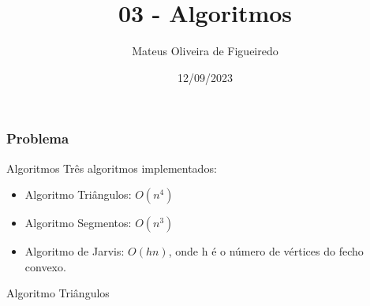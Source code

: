 \documentclass[aspectratio=169,usenames,dvipsnames]{beamer}
\title{03 - Algoritmos}
\author{Mateus Oliveira de Figueiredo}
\date{12/09/2023}
\begin{document}
\begin{frame}
\titlepage
\end{frame}

\begin{frame}
\frametitle{Problema}

\begin{figure}
\begin{overprint}
\end{overprint}
\end{figure}

\end{frame}

\begin{frame}{Algoritmos}
      Três algoritmos implementados:
      \begin{itemize}
        \item Algoritmo Triângulos: $O(n^4)$
        \item Algoritmo Segmentos: $O(n^3)$
        \item Algoritmo de Jarvis: $O(hn)$, onde h é o número de vértices do fecho convexo.
      \end{itemize}

      \vspace{1cm}
\end{frame}

\begin{frame}{Algoritmo Triângulos}

  \begin{center}
      \begin{overprint}
      \end{overprint}
  \end{center}

  \begin{overprint}
  \end{overprint}
\end{frame}
\end{document}
